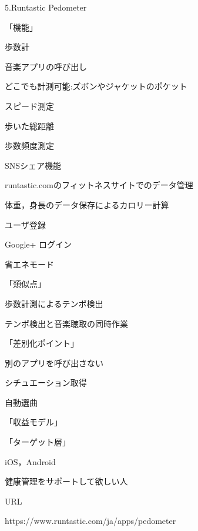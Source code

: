 \par
5.Runtastic Pedometer
\par
「機能」
\par
歩数計
\par
音楽アプリの呼び出し
\par
どこでも計測可能:ズボンやジャケットのポケット
\par
スピード測定
\par
歩いた総距離
\par
歩数頻度測定
\par
SNSシェア機能
\par
runtastic.comのフィットネスサイトでのデータ管理
\par
体重，身長のデータ保存によるカロリー計算
\par
ユーザ登録
\par
Google+ ログイン
\par
省エネモード
\par
「類似点」
\par
歩数計測によるテンポ検出
\par
テンポ検出と音楽聴取の同時作業
\par
「差別化ポイント」
\par
別のアプリを呼び出さない
\par
シチュエーション取得
\par
自動選曲
\par
「収益モデル」
\par
「ターゲット層」
\par
iOS，Android
\par
健康管理をサポートして欲しい人
\par
URL
\par
https://www.runtastic.com/ja/apps/pedometer
\\

